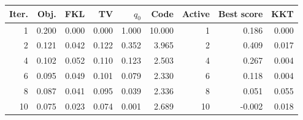 \begin{tabular}{rrrrrrrrr}
\toprule
Iter. & Obj. & FKL & TV & $q_0$ & Code & Active & Best score & KKT \\
\midrule
1 & 0.200 & 0.000 & 0.000 & 1.000 & 10.000 & 1 & 0.186 & 0.000 \\
2 & 0.121 & 0.042 & 0.122 & 0.352 & 3.965 & 2 & 0.409 & 0.017 \\
4 & 0.102 & 0.052 & 0.110 & 0.123 & 2.503 & 4 & 0.267 & 0.004 \\
6 & 0.095 & 0.049 & 0.101 & 0.079 & 2.330 & 6 & 0.118 & 0.004 \\
8 & 0.087 & 0.041 & 0.095 & 0.039 & 2.336 & 8 & 0.051 & 0.055 \\
10 & 0.075 & 0.023 & 0.074 & 0.001 & 2.689 & 10 & -0.002 & 0.018 \\
\bottomrule
\end{tabular}
